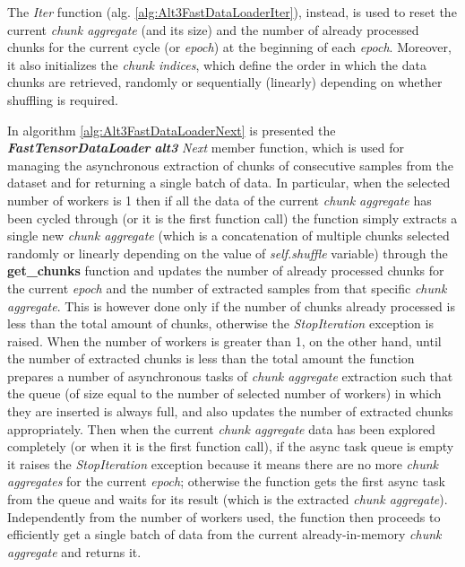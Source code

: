 \documentclass[pdfa%
,cucitura%
]{toptesi}
\begin{document}
The \textit{Iter} function (alg. \ref{alg:Alt3FastDataLoaderIter}), instead, is used to reset the current \textit{chunk aggregate} (and its size) and the number of already processed chunks for the current cycle (or \textit{epoch}) at the beginning of each \textit{epoch}. Moreover, it also initializes the \textit{chunk indices}, which define the order in which the data chunks are retrieved, randomly or sequentially (linearly) depending on whether shuffling is required.

In algorithm \ref{alg:Alt3FastDataLoaderNext} is presented the \textit{\textbf{FastTensorDataLoader}} \textit{\textbf{alt3}} \textit{Next} member function, which is used for managing the asynchronous extraction of chunks of consecutive samples from the dataset and for returning a single batch of data. In particular, when the selected number of workers is 1 then if all the data of the current \textit{chunk aggregate} has been cycled through (or it is the first function call) the function simply extracts a single new \textit{chunk aggregate} (which is a concatenation of multiple chunks selected randomly or linearly depending on the value of \textit{self.shuffle} variable) through the \textbf{get\_chunks} function and updates the number of already processed chunks for the current \textit{epoch} and the number of extracted samples from that specific \textit{chunk aggregate}. This is however done only if the number of chunks already processed is less than the total amount of chunks, otherwise the \textit{StopIteration} exception is raised. When the number of workers is greater than 1, on the other hand, until the number of extracted chunks is less than the total amount the function prepares a number of asynchronous tasks of \textit{chunk aggregate} extraction such that the queue (of size equal to the number of selected number of workers) in which they are inserted is always full, and also updates the number of extracted chunks appropriately. Then when the current \textit{chunk aggregate} data has been explored completely (or when it is the first function call), if the async task queue is empty it raises the \textit{StopIteration} exception because it means there are no more \textit{chunk aggregates} for the current \textit{epoch}; otherwise the function gets the first async task from the queue and waits for its result (which is the extracted \textit{chunk aggregate}). Independently from the number of workers used, the function then proceeds to efficiently get a single batch of data from the current already-in-memory \textit{chunk aggregate} and returns it.
\end{document}
